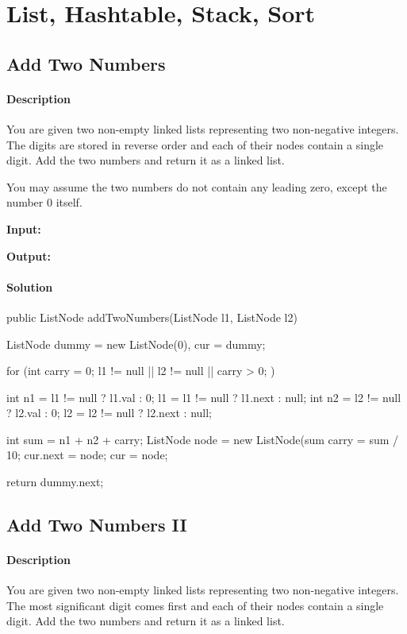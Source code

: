 \chapter{List, Hashtable, Stack, Sort}

\section{Add Two Numbers} %

\subsubsection{Description}
You are given two non-empty linked lists representing two non-negative integers. The digits are stored in reverse order and each of their nodes contain a single digit. Add the two numbers and return it as a linked list.

You may assume the two numbers do not contain any leading zero, except the number 0 itself.

\textbf{Input:} 

\textbf{Output:} 

\subsubsection{Solution}

\begin{Code}
public ListNode addTwoNumbers(ListNode l1, ListNode l2) {
    ListNode dummy = new ListNode(0), cur = dummy;

    for (int carry = 0; l1 != null || l2 != null || carry > 0; ) {
        int n1 = l1 != null ? l1.val : 0;
        l1 = l1 != null ? l1.next : null;
        int n2 = l2 != null ? l2.val : 0;
        l2 = l2 != null ? l2.next : null;

        int sum = n1 + n2 + carry;
        ListNode node = new ListNode(sum %
        carry = sum / 10;
        cur.next = node;
        cur = node;
    }

    return dummy.next;
}
\end{Code}

\newpage

\section{Add Two Numbers II} %

\subsubsection{Description}
You are given two non-empty linked lists representing two non-negative integers. The most significant digit comes first and each of their nodes contain a single digit. Add the two numbers and return it as a linked list.

